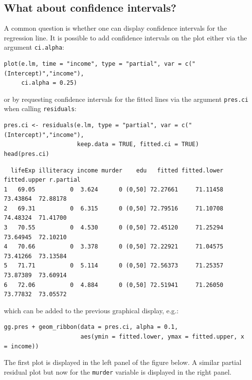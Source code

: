\documentclass[12pt]{article}
\begin{document}
\bigskip

\subsection{What about confidence intervals?}
\label{sec:org84e5850}

A common question is whether one can display confidence intervals for
the regression line. It is possible to add confidence intervals on the
plot either via the argument \texttt{ci.alpha}:
\lstset{language=r,label= ,caption= ,captionpos=b,numbers=none}
\begin{lstlisting}
plot(e.lm, time = "income", type = "partial", var = c("(Intercept)","income"),
     ci.alpha = 0.25)
\end{lstlisting}

or by requesting confidence intervals for the fitted lines via the
argument \texttt{pres.ci} when calling \texttt{residuals}:
\lstset{language=r,label= ,caption= ,captionpos=b,numbers=none}
\begin{lstlisting}
pres.ci <- residuals(e.lm, type = "partial", var = c("(Intercept)","income"),
                     keep.data = TRUE, fitted.ci = TRUE)
head(pres.ci)
\end{lstlisting}

\begin{verbatim}
  lifeExp illiteracy income murder    edu   fitted fitted.lower fitted.upper r.partial
1   69.05          0  3.624      0 (0,50] 72.27661     71.11458     73.43864  72.88178
2   69.31          0  6.315      0 (0,50] 72.79516     71.10708     74.48324  71.41700
3   70.55          0  4.530      0 (0,50] 72.45120     71.25294     73.64945  72.10210
4   70.66          0  3.378      0 (0,50] 72.22921     71.04575     73.41266  73.13584
5   71.71          0  5.114      0 (0,50] 72.56373     71.25357     73.87389  73.60914
6   72.06          0  4.884      0 (0,50] 72.51941     71.26050     73.77832  73.05572
\end{verbatim}


which can be added to the previous graphical display, e.g.:
\lstset{language=r,label= ,caption= ,captionpos=b,numbers=none}
\begin{lstlisting}
gg.pres + geom_ribbon(data = pres.ci, alpha = 0.1,
                      aes(ymin = fitted.lower, ymax = fitted.upper, x = income))
\end{lstlisting}

The first plot is displayed in the left panel of the figure below. A
similar partial residual plot but now for the \texttt{murder} variable is
displayed in the right panel.
\end{document}
